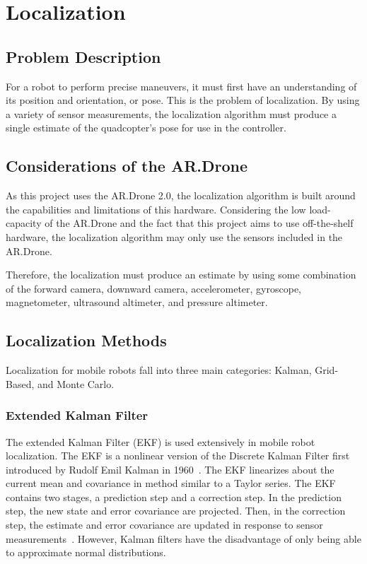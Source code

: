 
\chapter{Localization\label{ch:localization}}

\section{Problem Description}
	For a robot to perform precise maneuvers, it must first have an understanding of its position and orientation, or pose. This is the problem of localization. By using a variety of sensor measurements, the localization algorithm must produce a single estimate of the quadcopter's pose for use in the controller.

\section{Considerations of the AR.Drone}

	As this project uses the AR.Drone 2.0, the localization algorithm is built around the capabilities and limitations of this hardware. Considering the low load-capacity of the AR.Drone and the fact that this project aims to use off-the-shelf hardware, the localization algorithm may only use the sensors included in the AR.Drone.

	Therefore, the localization must produce an estimate by using some combination of the forward camera, downward camera, accelerometer, gyroscope, magnetometer, ultrasound altimeter, and pressure altimeter. 

\section{Localization Methods}

	Localization for mobile robots fall into three main categories: Kalman, Grid-Based, and Monte Carlo.

	\subsection{Extended Kalman Filter}
	The extended Kalman Filter (EKF) is used extensively in mobile robot localization. The EKF is a nonlinear version of the Discrete Kalman Filter first introduced by Rudolf Emil Kalman in 1960~\cite{Kalman}. The EKF linearizes about the current mean and covariance in  method similar to a Taylor series. The EKF contains two stages, a prediction step and a correction step. In the prediction step, the new state and error covariance are projected. Then, in the correction step, the estimate and error covariance are updated in response to sensor measurements~\cite{Welch}. However, Kalman filters have the disadvantage of only being able to approximate normal distributions.

